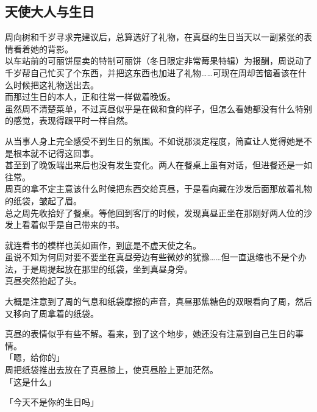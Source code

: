 \subsection{天使大人与生日}

周向树和千岁寻求完建议后，总算选好了礼物，在真昼的生日当天以一副紧张的表情看着她的背影。\\

以车站前的可丽饼屋卖的特制可丽饼（冬日限定非常莓果特辑）为报酬，周说动了千岁帮自己忙买了个东西，并把这东西也加进了礼物……可现在周却苦恼着该在什么时候把这礼物送出去。\\

而那过生日的本人，正和往常一样做着晚饭。\\

虽然周不清楚菜单，不过真昼似乎是在做和食的样子，但怎么看她都没有什么特别的感觉，表现得跟平时一样自然。

从当事人身上完全感受不到生日的氛围。不如说那淡定程度，简直让人觉得她是不是根本就不记得这回事。\\

甚至到了晚饭端出来后也没有发生变化。两人在餐桌上虽有对话，但进餐还是一如往常。\\

周真的拿不定主意该什么时候把东西交给真昼，于是看向藏在沙发后面那放着礼物的纸袋，皱起了眉。\\

总之周先收拾好了餐桌。等他回到客厅的时候，发现真昼正坐在那刚好两人位的沙发上看着似乎是自己带来的书。

就连看书的模样也美如画作，到底是不虚天使之名。\\

虽说不知为何周对要不要坐在真昼旁边有些微妙的犹豫……但一直退缩也不是个办法，于是周提起放在那里的纸袋，坐到真昼身旁。\\

真昼突然抬起了头。

大概是注意到了周的气息和纸袋摩擦的声音，真昼那焦糖色的双眼看向了周，然后又移向了周拿着的纸袋。

真昼的表情似乎有些不解。看来，到了这个地步，她还没有注意到自己生日的事情。\\

「嗯，给你的」\\

周把纸袋推出去放在了真昼膝上，使真昼脸上更加茫然。\\

「这是什么」

「今天不是你的生日吗」

